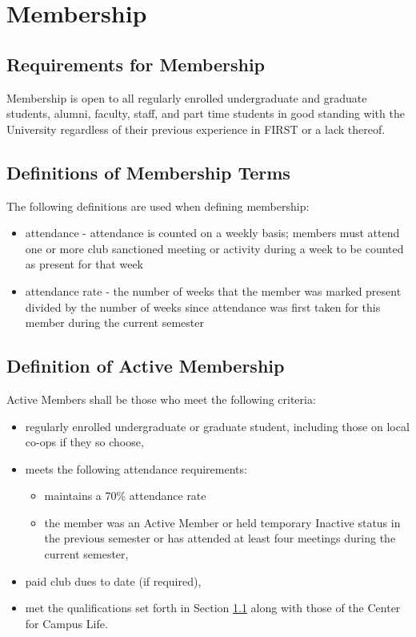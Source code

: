 \documentclass[english,11pt]{article}
\begin{document}
\section{Membership} \label{art:membership}

\subsection{Requirements for Membership} \label{sect:membership:requirements}
Membership is open to all regularly enrolled undergraduate and graduate students, alumni, faculty, staff, and part time students in good standing with the University regardless of their previous experience in FIRST or a lack thereof.

\subsection{Definitions of Membership Terms} \label{sect:membership:definitions}
The following definitions are used when defining membership:

\begin{itemize}
    \item attendance - attendance is counted on a weekly basis; members must attend one or more club sanctioned meeting or activity during a week to be counted as present for that week
    \item attendance rate - the number of weeks that the member was marked present divided by the number of weeks since attendance was first taken for this member during the current semester
\end{itemize}

\subsection{Definition of Active Membership} \label{sect:membership:active}
Active Members shall be those who meet the following criteria:
\begin{itemize}
    \item regularly enrolled undergraduate or graduate student, including those on local co-ops if they so choose,
    \item meets the following attendance requirements:
    \begin{itemize}
        \item maintains a 70\% attendance rate
        \item the member was an Active Member or held temporary Inactive status in the previous semester or has attended at least four meetings during the current semester,
    \end{itemize}
    \item paid club dues to date (if required),
    \item met the qualifications set forth in Section \ref{sect:membership:requirements} along with those of the Center for Campus Life.
\end{itemize}
\end{document}
